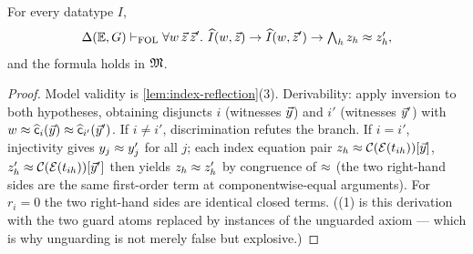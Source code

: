 \begin{proposition}
\label{prop:index-unique}
For every datatype $I$,
\[
  \Delta(\mathbb{E},G) \vdash_{\mathrm{FOL}} \forall w\,\vec{z}\,\vec{z}'.\
  \widehat{I}(w, \vec{z}) \to \widehat{I}(w, \vec{z}') \to
  \textstyle\bigwedge_h z_h \approx z'_h,
\]
and the formula holds in $\mathfrak{M}$.
\end{proposition}

\begin{proof}
Model validity is \cref{lem:index-reflection}(3).  Derivability: apply
inversion to both hypotheses, obtaining disjuncts $i$ (witnesses
$\vec{y}$) and $i'$ (witnesses $\vec{y}'$) with $w \approx
\widehat{\mathsf{c}}_i(\vec{y}) \approx \widehat{\mathsf{c}}_{i'}(\vec{y}')$.  If $i
\neq i'$, discrimination refutes the branch.  If $i = i'$, injectivity
gives $y_j \approx y'_j$ for all $j$; each index equation pair $z_h \approx
\mathcal{C}(\mathcal{E}(t_{ih}))[\vec{y}]$, $z'_h \approx
\mathcal{C}(\mathcal{E}(t_{ih}))[\vec{y}']$ then yields $z_h \approx z'_h$ by
congruence of $\approx$ (the two right-hand sides are the same first-order
term at componentwise-equal arguments).  For $r_i = 0$ the two
right-hand sides are identical closed terms.
((1) is this derivation with the two
guard atoms replaced by instances of the unguarded axiom --- which is
why unguarding is not merely false but explosive.)
\end{proof}

